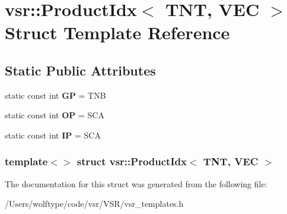 \hypertarget{structvsr_1_1_product_idx_3_01_t_n_t_00_01_v_e_c_01_4}{\section{vsr\-:\-:Product\-Idx$<$ T\-N\-T, V\-E\-C $>$ Struct Template Reference}
\label{structvsr_1_1_product_idx_3_01_t_n_t_00_01_v_e_c_01_4}
}
\subsection*{Static Public Attributes}
\begin{DoxyCompactItemize}
\item 
\hypertarget{structvsr_1_1_product_idx_3_01_t_n_t_00_01_v_e_c_01_4_a6891d3c1a9af018979cde55555554522}{static const int {\bfseries G\-P} = T\-N\-B}\label{structvsr_1_1_product_idx_3_01_t_n_t_00_01_v_e_c_01_4_a6891d3c1a9af018979cde55555554522}

\item 
\hypertarget{structvsr_1_1_product_idx_3_01_t_n_t_00_01_v_e_c_01_4_a94ca7022cf84faa7d266bc767729bfba}{static const int {\bfseries O\-P} = S\-C\-A}\label{structvsr_1_1_product_idx_3_01_t_n_t_00_01_v_e_c_01_4_a94ca7022cf84faa7d266bc767729bfba}

\item 
\hypertarget{structvsr_1_1_product_idx_3_01_t_n_t_00_01_v_e_c_01_4_a31a1a3b99ba7ccffd759c0c4740f3ec6}{static const int {\bfseries I\-P} = S\-C\-A}\label{structvsr_1_1_product_idx_3_01_t_n_t_00_01_v_e_c_01_4_a31a1a3b99ba7ccffd759c0c4740f3ec6}

\end{DoxyCompactItemize}
\subsubsection*{template$<$$>$ struct vsr\-::\-Product\-Idx$<$ T\-N\-T, V\-E\-C $>$}



The documentation for this struct was generated from the following file\-:\begin{DoxyCompactItemize}
\item 
/\-Users/wolftype/code/vsr/\-V\-S\-R/vsr\-\_\-templates.\-h\end{DoxyCompactItemize}
